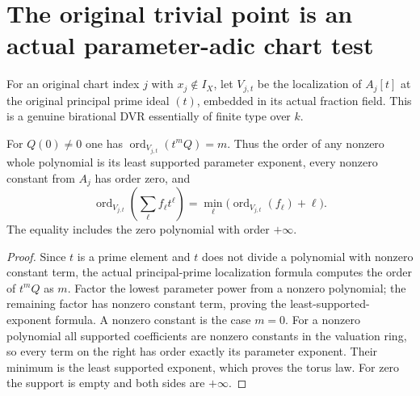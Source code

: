 \section{The original trivial point is an actual parameter-adic chart test}

\begin{definition}
\label{def:c0n-chart-parameter-adic-dvr}
\leanok
For an original chart index $j$ with $x_j\notin I_X$, let
$V_{j,t}$ be the localization of $A_j[t]$ at the original principal prime
ideal $(t)$, embedded in its actual fraction field.
This is a genuine birational DVR essentially of finite type over $k$.
\end{definition}

\begin{lemma}
\label{lem:c0n-chart-parameter-adic-orders}
\leanok
For $Q(0)\ne0$ one has $\operatorname{ord}_{V_{j,t}}(t^mQ)=m$.
Thus the order of any nonzero whole polynomial is its least supported
parameter exponent, every nonzero constant from $A_j$ has order zero,
and
\[
 \operatorname{ord}_{V_{j,t}}\!\left(\sum_\ell f_\ell t^\ell\right)
 =\min_\ell\bigl(\operatorname{ord}_{V_{j,t}}(f_\ell)+\ell\bigr).
\]
The equality includes the zero polynomial with order $+\infty$.
\end{lemma}
\begin{proof}
Since $t$ is a prime element and $t$ does not divide a polynomial with
nonzero constant term, the actual principal-prime localization formula
computes the order of $t^mQ$ as $m$.
Factor the lowest parameter power from a nonzero polynomial; the remaining
factor has nonzero constant term, proving the least-supported-exponent
formula.  A nonzero constant is the case $m=0$.
For a nonzero polynomial all supported coefficients are nonzero constants
in the valuation ring, so every term on the right has order exactly its
parameter exponent.  Their minimum is the least supported exponent,
which proves the torus law.  For zero the support is empty and both sides
are $+\infty$.
\end{proof}


